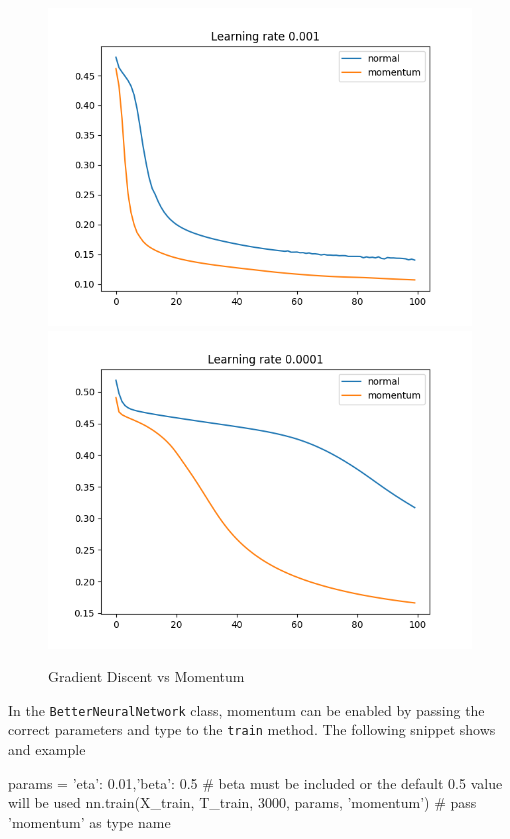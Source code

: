 \documentclass[11pt]{article}
\begin{document}
\begin{figure}[H]
\includegraphics[scale=0.5]{images/momentum_plot_0,001.png}	
\includegraphics[scale=0.5]{images/momentum_plot_0,0001.png}	
\caption{Gradient Discent vs Momentum}
\end{figure}
In the \texttt{BetterNeuralNetwork} class, momentum can be enabled by passing the correct parameters and type to the \texttt{train} method. The following snippet shows and example

\begin{python}
params = {'eta': 0.01,'beta': 0.5} # beta must be included or the default 0.5 value will be used
nn.train(X_train, T_train, 3000, params, 'momentum')	 # pass 'momentum' as type name
\end{python}
\end{document}
